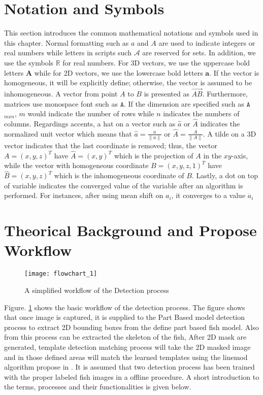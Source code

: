 \section{Notation and Symbols}
This section introduces the common mathematical notations and symbols used in this 
chapter.
Normal formatting such as $a$ and $A$ are used to indicate integers or real numbers 
while letters in scripts such $\mathcal{A}$ are reserved for sets. In addition, 
we use the symbols $\mathbb{R}$ for real numbers.
For 3D vectors, we use the uppercase bold letters $\mathbf{A}$ while for 2D vectors, 
we use the lowercase bold letters $\mathbf{a}$. If the vector is homogeneous, it will
be explicitly define; otherwise, the vector is assumed to be inhomogeneous. A vector
from point $A$ to $B$ is presented as $\overrightarrow{AB}$. Furthermore, matrices use
monospace font such as $\mathtt{A}$. If the dimension are specified such as $\mathtt{A}$$_{mxn}$,
$m$ would indicate the number of rows while $n$ indicates the numbers of columns.
Regardings accents, a hat on a vector such as $\hat{a}$ or $\hat{A}$ indicates the normalized
unit vector which means that $\hat{a}=\frac{a}{\|a\|}$ or $\hat{A}=\frac{A}{\|A\|}$.
A tilde on a 3D vector indicates that the last coordinate is removed; thus, the vector 
$A=(x,y,z)^T$ have $\hat{A}=(x,y)^T$  which is the projection of $A$ in the $xy$-axis,
while the vector with homogeneous coordinate $B=(x,y,z,1)^T$ have $\hat{B}=(x,y,z)^T$ 
which is the inhomogeneous coordinate of $B$. Lastly, a dot on top of variable indicates
the converged value of the variable after an algorithm is performed. For instances,
after using mean shift on $a_i$, it converges to a value $\dot{a}_i$

\section{Theorical Background and Propose Workflow}
\label{sec:workflow}

\begin{figure}[ht]
\centering
\texttt{[image: flowchart\_1]}
\caption{A simplified workflow of the Detection process}
\label{fig:basicworkflow}
\end{figure}

Figure. \ref{fig:basicworkflow} shows the basic workflow of the detection process. The figure 
shows that once image is captured, it is supplied to the Part Based model detection 
process to extract 2D bounding boxes from the define part based fish model. Also from
this process can be extracted the skeleton of the fish, After 2D mask are generated, 
template detection matching process will take the 2D masked image and in those defined
areas will match the learned templates using the linemod algorithm propose in \citet{Hinterstoisser2012}. It is assumed that two detection process has been trained with the
proper labeled fish images in a offline procedure. A short introduction to the terms, processes and their functionalities is given below.

